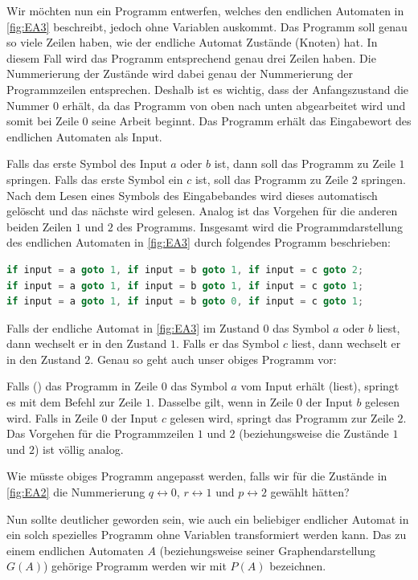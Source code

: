 Wir möchten nun ein Programm entwerfen, welches den endlichen Automaten in \cref{fig:EA3} beschreibt, jedoch ohne Variablen auskommt. Das Programm soll genau so viele Zeilen haben, wie der endliche Automat Zustände (Knoten) hat. In diesem Fall wird das Programm entsprechend genau drei Zeilen haben. Die Nummerierung der Zustände wird dabei genau der Nummerierung der Programmzeilen entsprechen. Deshalb ist es wichtig, dass der Anfangszustand die Nummer $0$ erhält, da das Programm von oben nach unten abgearbeitet wird und somit bei Zeile $0$ seine Arbeit beginnt. Das Programm erhält das Eingabewort des endlichen Automaten als Input.

Falls das erste Symbol des Input $a$ oder $b$ ist, dann soll das Programm zu Zeile $1$ springen. Falls das erste Symbol ein $c$ ist, soll das Programm zu Zeile $2$ springen. Nach dem Lesen eines Symbols des Eingabebandes wird dieses automatisch gelöscht und das nächste wird gelesen. Analog ist das Vorgehen für die anderen beiden Zeilen $1$ und $2$ des Programms. Insgesamt wird die Programmdarstellung des endlichen Automaten in \cref{fig:EA3} durch folgendes Programm beschrieben:
\begin{lstlisting}[language=C++, firstnumber=0]
if input = a goto 1, if input = b goto 1, if input = c goto 2;
if input = a goto 1, if input = b goto 1, if input = c goto 1;
if input = a goto 1, if input = b goto 0, if input = c goto 1;
\end{lstlisting}
Falls der endliche Automat in \cref{fig:EA3} im Zustand $0$ das Symbol $a$ oder $b$ liest, dann wechselt er in den Zustand $1$. Falls er das Symbol $c$ liest, dann wechselt er in den Zustand $2$. Genau so geht auch unser obiges Programm vor:

Falls () das Programm in Zeile $0$ das Symbol $a$ vom Input erhält (liest), springt es mit dem  Befehl zur Zeile $1$. Dasselbe gilt, wenn in Zeile $0$ der Input $b$ gelesen wird. Falls in Zeile $0$ der Input $c$ gelesen wird, springt das Programm zur Zeile $2$. Das Vorgehen für die Programmzeilen $1$ und $2$ (beziehungsweise die Zustände $1$ und $2$) ist völlig analog.

\begin{myexercise}\label{myexercise:0403}
	Wie müsste obiges Programm angepasst werden, falls wir für die Zustände in \cref{fig:EA2} die Nummerierung $q \leftrightarrow 0$, $r \leftrightarrow 1$ und $p \leftrightarrow 2$ gewählt hätten?
\end{myexercise}

Nun sollte deutlicher geworden sein, wie auch ein beliebiger endlicher Automat in ein solch spezielles Programm ohne Variablen transformiert werden kann. Das zu einem endlichen Automaten $A$ (beziehungsweise seiner Graphendarstellung $G(A)$) gehörige Programm werden wir mit $P(A)$ bezeichnen.

